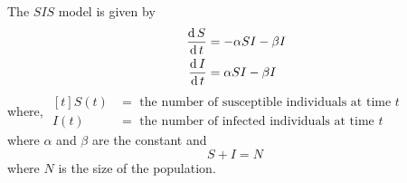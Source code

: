 \documentclass[../main-sheet.tex]{subfiles}
\begin{document}
\begin{soln}
    The \(SIS\) model is given by
    \begin{align}
        \,\frac{\mathrm{d}\,S}{\mathrm{d}\,t}&=-\alpha SI-\beta I \label{eq:si1}\\
        \,\frac{\mathrm{d}\,I}{\mathrm{d}\,t}&=\alpha SI-\beta I \label{eq:si2}
    \end{align}
    where, \(\begin{aligned}[t]
        S(t)&= \text{ the number of susceptible individuals at time } t\\
        I(t)&= \text{ the number of infected individuals at time } t
    \end{aligned}\)\\
    where \(\alpha\) and \(\beta\) are the constant and
    \begin{equation}
        S+I=N\label{eq:si3}
    \end{equation}
    where \(N\) is the size of the population.\\


\end{soln}
\end{document}
